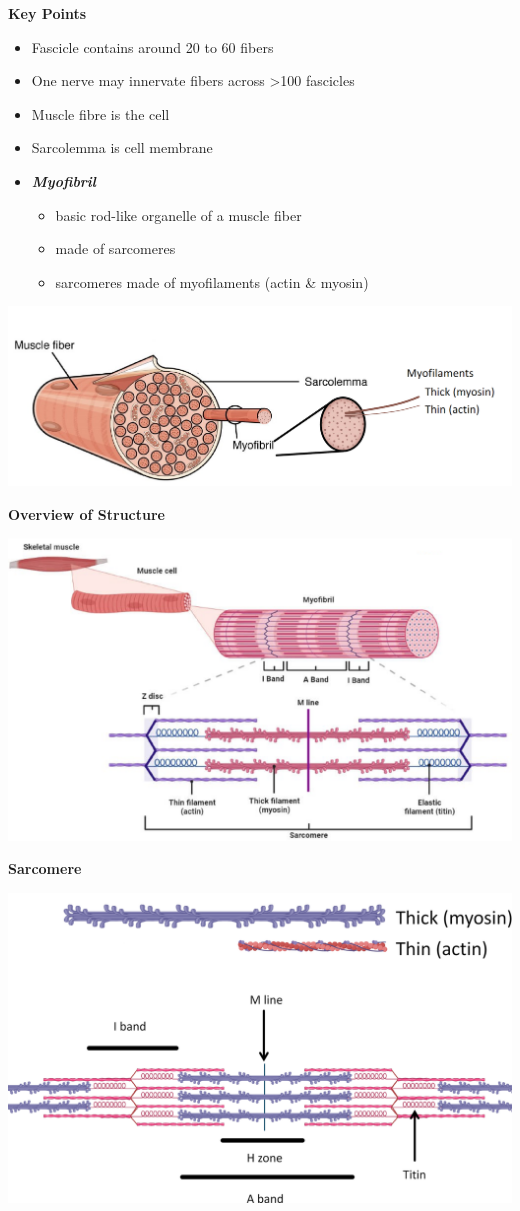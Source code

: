 \documentclass[11pt,fleqn]{book}
\begin{document}
\textbf{Key Points}
\begin{itemize}
    \item Fascicle contains around 20 to 60 fibers
    \item One nerve may innervate fibers across >100 fascicles
    \item Muscle fibre is the cell
    \item Sarcolemma is cell membrane
    \item \textbf{\textit{Myofibril}}
    \begin{itemize}
        \item basic rod-like organelle of a muscle fiber
        \item made of sarcomeres
        \item sarcomeres made of myofilaments (actin \& myosin)
    \end{itemize}
\end{itemize}
\begin{center}
    \includegraphics[width=0.65\linewidth]{Pictures/Screenshot 2024-04-03 005053.png}
\end{center}
\textbf{Overview of Structure}
\begin{center}
    \includegraphics[width=0.65\linewidth]{Pictures/Screenshot 2024-04-03 005340.png}
\end{center}
\textbf{Sarcomere}
\begin{center}
    \includegraphics[width=0.65\linewidth]{Pictures/Screenshot 2024-04-03 005431.png}
\end{center}
\end{document}
